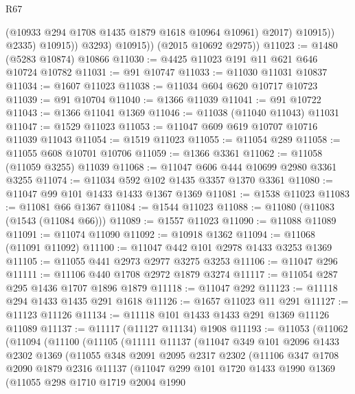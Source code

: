 \begin{lexlean}{R67}
\begin{coremodule}
                        (@10933 @294 @1708 @1435 @1879 @1618 @10964 @10961)
                        @2017)
                      @10915))
                  @2335)
                @10915))
            @3293)
          @10915))
      (@2015 @10692 @2975))
@11023 := @1480 (@5283 @10874) @10866
@11030 := @4425 @11023 @191 @11 @621 @646 @10724 @10782
@11031 := @91 @10747
@11033 := @11030 @11031 @10837
@11034 := @1607 @11023
@11038 := @11034 @604 @620 @10717 @10723
@11039 := @91 @10704
@11040 := @1366 @11039
@11041 := @91 @10722
@11043 := @1366 @11041 @1369
@11046 := @11038 (@11040 @11043) @11031
@11047 := @1529 @11023
@11053 := @11047 @609 @619 @10707 @10716 @11039 @11043
@11054 := @1519 @11023
@11055 := @11054 @289
@11058 := @11055 @608 @10701 @10706
@11059 := @1366 @3361
@11062 := @11058 (@11059 @3255) @11039
@11068 := @11047 @606 @444 @10699 @2980 @3361 @3255
@11074 := @11034 @592 @102 @1435 @3357 @1370 @3361
@11080 := @11047 @99 @101 @1433 @1433 @1367 @1369
@11081 := @1538 @11023
@11083 := @11081 @66 @1367
@11084 := @1544 @11023
@11088 := @11080 (@11083 (@1543 (@11084 @66)))
@11089 := @1557 @11023
@11090 := @11088 @11089
@11091 := @11074 @11090
@11092 := @10918 @1362
@11094 := @11068 (@11091 @11092)
@11100 := @11047 @442 @101 @2978 @1433 @3253 @1369
@11105 := @11055 @441 @2973 @2977 @3275 @3253
@11106 := @11047 @296
@11111 := @11106 @440 @1708 @2972 @1879 @3274
@11117 := @11054 @287 @295 @1436 @1707 @1896 @1879
@11118 := @11047 @292
@11123 := @11118 @294 @1433 @1435 @291 @1618
@11126 := @1657 @11023 @11 @291
@11127 := @11123 @11126
@11134 := @11118 @101 @1433 @1433 @291 @1369 @11126 @11089
@11137 := @11117 (@11127 @11134) @1908
@11193 := @11053
    (@11062
      (@11094
        (@11100
          (@11105
            (@11111
              @11137
              (@11047
                @349
                @101
                @2096
                @1433
                @2302
                @1369
                (@11055
                  @348
                  @2091
                  @2095
                  @2317
                  @2302
                  (@11106
                    @347
                    @1708
                    @2090
                    @1879
                    @2316
                    @11137
                    (@11047
                      @299
                      @101
                      @1720
                      @1433
                      @1990
                      @1369
                      (@11055
                        @298
                        @1710
                        @1719
                        @2004
                        @1990

\end{coremodule}
\end{lexlean}
